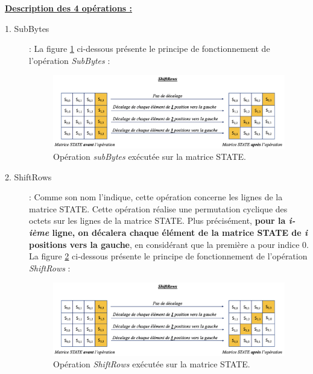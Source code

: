 \documentclass[10pt, oneside, a4paper]{article}
\begin{document}
\underline{\textbf{Description des 4 opérations :}} \\
\begin{description}
\item[1. SubBytes] : 
La figure \ref{fig:subByte} ci-dessous présente le principe de fonctionnement de l'opération \textit{SubBytes} :
\begin{figure}[htbp]
    \centering
    \includegraphics[width=1.05\textwidth]{image/ligne}
    \caption{Opération \textit{subBytes} exécutée sur la matrice STATE.}
    \label{fig:subByte}
\end{figure}

\item[2. ShiftRows] : Comme son nom l'indique, cette opération concerne les lignes de la matrice STATE. Cette opération réalise une permutation cyclique des octets sur les lignes de la matrice STATE. Plus précisément, \textbf{pour la \textit{i-ième} ligne, on décalera chaque élément de la matrice STATE de \textit{i} positions vers la gauche}, en considérant que la première a pour indice 0.
La figure \ref{fig:ligne} ci-dessous présente le principe de fonctionnement de l'opération \textit{ShiftRows} :
\begin{figure}[htbp]
    \centering
    \includegraphics[width=1.05\textwidth]{image/ligne}
    \caption{Opération \textit{ShiftRows} exécutée sur la matrice STATE.}
    \label{fig:ligne}
\end{figure}


\end{description}
\end{document}
